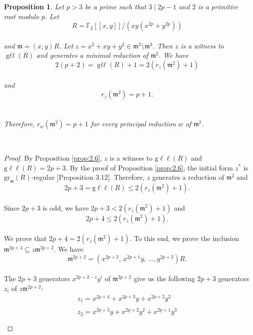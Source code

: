 \documentclass{amsart}
\newtheorem{proposition}[theorem]{Proposition}
\theoremstyle{definition}
\theoremstyle{definition}
\numberwithin{equation}{section}
\theoremstyle{definition}
\DeclareMathOperator{\Gll}{g\ell\ell}
\begin{document}
{\begin{proposition}\label{prop:2.9}
Let $p>3$ be a prime such that $3 \mid 2p-1$ and $2$ is a primitive root modulo $p$. Let \\
\[
R=\mathbb{F}_2[[x,y]] \bigg/ \left(xy \left(x^{2p} + y^{2p} \right) \right)
\] \text{}\\ and $\mathfrak{m}=(x,y)R$. Let $z=x^2 + xy + y^2 \in \mathfrak{m}^2 \setminus \mathfrak{m}^3$. Then $z$ is a witness to $\Gll(R)$ and generates a minimal reduction of $\mathfrak{m}^2$. We have \\
\[
2(p+2)=\Gll(R)+1=2 \left(r_{z}(\mathfrak{m}^2) + 1 \right)
\] \text{}\\ and
\[
r_{z}(\mathfrak{m}^2) = p+1.
\] \text{}\\\\
Therefore, $r_{w}(\mathfrak{m}^2)=p+1$ for every principal reduction $w$ of $\mathfrak{m}^2$.
\end{proposition}
\text{}\\
\begin{proof} 
By Proposition \ref{prop:2.6}, $z$ is a witness to $\text{g}\ell\ell(R)$ and $\text{g}\ell\ell(R)=2p+3$. By the proof of Proposition \ref{prop:2.6}, the initial form $z^*$ is $\text{gr}_{\mathfrak{m}}(R)$-regular \cite{Bartels24}[Proposition 3.12]. Therefore, $z$ generates a reduction of $\mathfrak{m}^2$ and \\
\begin{equation*}\label{equation:1}
2p+3=\text{g}\ell\ell(R) \leq 2 \left(r_{z}(\mathfrak{m}^2) + 1 \right).
\end{equation*}\text{}\\
Since $2p+3$ is odd, we have $2p+3<2 \left(r_{z}(\mathfrak{m}^2)+1 \right)$ and \\
\[
2p+4 \leq 2 \left(r_{z}(\mathfrak{m}^2) + 1\right).
\]\text{}\\
We prove that $2p+4=2\left(r_{z}(\mathfrak{m}^2) + 1 \right)$. To this end, we prove the inclusion $\mathfrak{m}^{2p+4} \subseteq z \mathfrak{m}^{2p+2}$. We have 
\[
\mathfrak{m}^{2p+2}=\left(x^{2p+2},\, x^ {2p+1}y, \, \dots, y^{2p+2} \right)R.
\] \text{}\\ The $2p+3$ generators $x^{2p+2-i}y^i$ of $\mathfrak{m}^{2p+2}$ give us the following $2p+3$ generators $z_i$ of $z\mathfrak{m}^{2p+2}$:\\
\begin{align*}
&z_1 = x^{2p+4} + x^{2p+3}y + x^{2p+2}y^2&\\\\
&z_2 = x^{2p+3}y + x^{2p+2}y^2 + x^{2p+1}y^3&\\\\

\end{align*}
\end{proof}}
\end{document}
